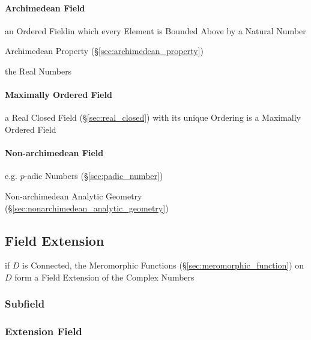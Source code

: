 \begin{itemize}
\paragraph{Archimedean Field}\label{sec:archimedean_field}\hfill

an Ordered Fieldin which every Element is Bounded Above by a Natural Number

Archimedean Property (\S\ref{sec:archimedean_property})

the Real Numbers



\paragraph{Maximally Ordered Field}\label{sec:maximally_ordered_field}\hfill

a Real Closed Field (\S\ref{sec:real_closed}) with its unique Ordering is a
Maximally Ordered Field



\paragraph{Non-archimedean Field}\label{sec:nonarchimedean_field}\hfill

e.g. $p$-adic Numbers (\S\ref{sec:padic_number})

\fist Non-archimedean Analytic Geometry
(\S\ref{sec:nonarchimedean_analytic_geometry})



\subsection{Field Extension}\label{sec:field_extension}

if $D$ is Connected, the Meromorphic Functions
(\S\ref{sec:meromorphic_function}) on $D$ form a Field Extension of the Complex
Numbers



\subsubsection{Subfield}\label{sec:subfield}

\subsubsection{Extension Field}\label{sec:extension_field}


\end{itemize}
